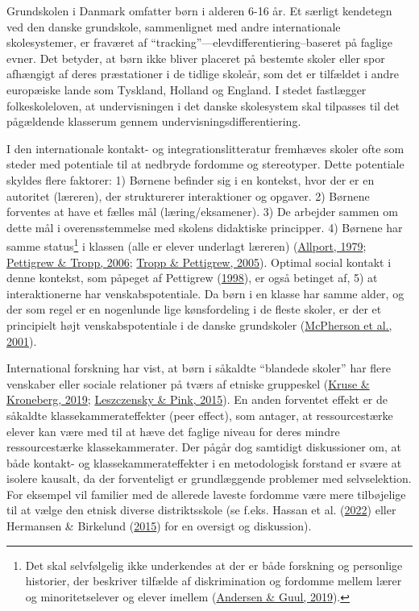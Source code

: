\documentclass[
]{book}
\begin{document}
Grundskolen i Danmark omfatter børn i alderen 6-16 år. Et særligt kendetegn ved den danske grundskole, sammenlignet med andre internationale skolesystemer, er fraværet af ``tracking''---elevdifferentiering--baseret på faglige evner. Det betyder, at børn ikke bliver placeret på bestemte skoler eller spor afhængigt af deres præstationer i de tidlige skoleår, som det er tilfældet i andre europæiske lande som Tyskland, Holland og England. I stedet fastlægger folkeskoleloven, at undervisningen i det danske skolesystem skal tilpasses til det pågældende klasserum gennem undervisningsdifferentiering.

I den internationale kontakt- og integrationslitteratur fremhæves skoler ofte som steder med potentiale til at nedbryde fordomme og stereotyper. Dette potentiale skyldes flere faktorer: 1) Børnene befinder sig i en kontekst, hvor der er en autoritet (læreren), der strukturerer interaktioner og opgaver. 2) Børnene forventes at have et fælles mål (læring/eksamener). 3) De arbejder sammen om dette mål i overensstemmelse med skolens didaktiske principper. 4) Børnene har samme status\footnote{Det skal selvfølgelig ikke underkendes at der er både forskning og personlige historier, der beskriver tilfælde af diskrimination og fordomme mellem lærer og minoritetselever og elever imellem (\protect\hyperlink{ref-andersen2019}{Andersen \& Guul, 2019}).} i klassen (alle er elever underlagt læreren) (\protect\hyperlink{ref-allport1979}{Allport, 1979}; \protect\hyperlink{ref-pettigrew2006}{Pettigrew \& Tropp, 2006}; \protect\hyperlink{ref-tropp2005}{Tropp \& Pettigrew, 2005}). Optimal social kontakt i denne kontekst, som påpeget af Pettigrew (\protect\hyperlink{ref-pettigrew1998}{1998}), er også betinget af, 5) at interaktionerne har venskabspotentiale. Da børn i en klasse har samme alder, og der som regel er en nogenlunde lige kønsfordeling i de fleste skoler, er der et principielt højt venskabspotentiale i de danske grundskoler (\protect\hyperlink{ref-mcpherson2001}{McPherson et al., 2001}).

International forskning har vist, at børn i såkaldte ``blandede skoler'' har flere venskaber eller sociale relationer på tværs af etniske gruppeskel (\protect\hyperlink{ref-kruse2019}{Kruse \& Kroneberg, 2019}; \protect\hyperlink{ref-leszczensky2015}{Leszczensky \& Pink, 2015}). En anden forventet effekt er de såkaldte klassekammerateffekter (peer effect), som antager, at ressourcestærke elever kan være med til at hæve det faglige niveau for deres mindre ressourcestærke klassekammerater. Der pågår dog samtidigt diskussioner om, at både kontakt- og klassekammerateffekter i en metodologisk forstand er svære at isolere kausalt, da der forventeligt er grundlæggende problemer med selvselektion. For eksempel vil familier med de allerede laveste fordomme være mere tilbøjelige til at vælge den etnisk diverse distriktsskole (se f.eks. Hassan et al. (\protect\hyperlink{ref-hassan2022}{2022}) eller Hermansen \& Birkelund (\protect\hyperlink{ref-hermansen2015}{2015}) for en oversigt og diskussion).
\end{document}
